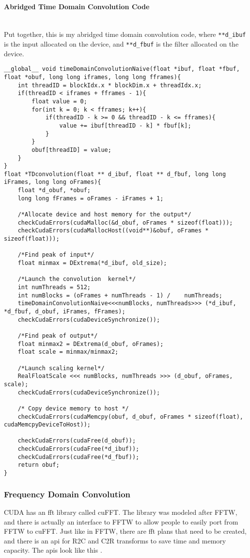 \paragraph{Abridged Time Domain Convolution Code} \hspace{0pt} \\
\indent Put together, this is my abridged time domain convolution code, where \verb|**d_ibuf| is the input allocated on the device, and \verb|**d_fbuf| is the filter allocated on the device.
\begin{verbatim}
__global__ void timeDomainConvolutionNaive(float *ibuf, float *fbuf, float *obuf, long long iframes, long long fframes){
	int threadID = blockIdx.x * blockDim.x + threadIdx.x;
	if(threadID < iframes + fframes - 1){
		float value = 0;
		for(int k = 0; k < fframes; k++){
			if(threadID - k >= 0 && threadID - k <= fframes){
				value += ibuf[threadID - k] * fbuf[k];
			}
		}
		obuf[threadID] = value;
	}
}
float *TDconvolution(float ** d_ibuf, float ** d_fbuf, long long iFrames, long long oFrames){
    float *d_obuf, *obuf;
    long long fFrames = oFrames - iFrames + 1;

    /*Allocate device and host memory for the output*/
    checkCudaErrors(cudaMalloc(&d_obuf, oFrames * sizeof(float)));
    checkCudaErrors(cudaMallocHost((void**)&obuf, oFrames * sizeof(float)));

    /*Find peak of input*/
    float minmax = DExtrema(*d_ibuf, old_size);

    /*Launch the convolution  kernel*/
    int numThreads = 512;
    int numBlocks = (oFrames + numThreads - 1) /    numThreads;
    timeDomainConvolutionNaive<<<numBlocks, numThreads>>> (*d_ibuf, *d_fbuf, d_obuf, iFrames, fFrames);
    checkCudaErrors(cudaDeviceSynchronize());

    /*Find peak of output*/
    float minmax2 = DExtrema(d_obuf, oFrames);
    float scale = minmax/minmax2;

    /*Launch scaling kernel*/
    RealFloatScale <<< numBlocks, numThreads >>> (d_obuf, oFrames, scale);
    checkCudaErrors(cudaDeviceSynchronize());

    /* Copy device memory to host */
    checkCudaErrors(cudaMemcpy(obuf, d_obuf, oFrames * sizeof(float), cudaMemcpyDeviceToHost));

    checkCudaErrors(cudaFree(d_obuf));
    checkCudaErrors(cudaFree(*d_ibuf));
    checkCudaErrors(cudaFree(*d_fbuf));
    return obuf;
}
\end{verbatim}
\subsubsection{Frequency Domain Convolution}
\indent \par CUDA has an \gls{fft} library called cuFFT. The library was modeled after FFTW, and there is actually an interface to FFTW to allow people to easily port from FFTW to cuFFT. Just like in FFTW, there are \gls{fft} plans that need to be created, and there is an \gls{api} for R2C and C2R transforms to save time and memory capacity. The \glspl{api} look like this \citep{cufft}.

